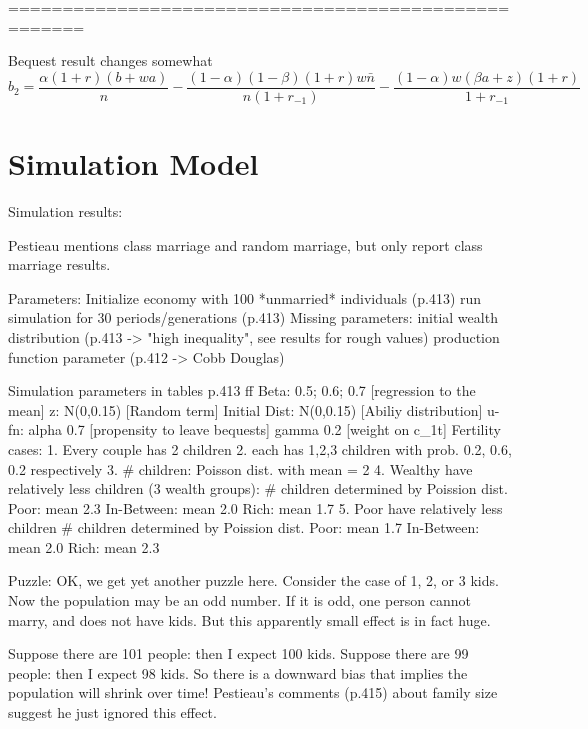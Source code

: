\documentclass{article}
\begin{document}
=====================================================

Bequest result changes somewhat
\begin{equation}
b_{2} =
\frac{\alpha(1+r)(b+wa)}{n}
- \frac{(1-\alpha)(1-\beta)(1+r)w\bar{n}}{n(1+r_{-1})}
- \frac{(1-\alpha)w(\beta a + z)(1+r)}{1+r_{-1}}
\label{Pestieau11p} \tag{Pestieau 11'}
\end{equation}


\section{Simulation Model}

Simulation results:

Pestieau mentions class marriage and random marriage,
but only report class marriage results.

\begin{verbatimtab}
Parameters:
	Initialize economy with 100 *unmarried* individuals (p.413)
	run simulation for 30 periods/generations (p.413)
Missing parameters:
        initial wealth distribution (p.413 -> "high inequality", see results for rough values)
        production function parameter (p.412 -> Cobb Douglas)

Simulation parameters in tables p.413 ff
	Beta:			0.5; 0.6; 0.7	[regression to the mean]
	z: 				N(0,0.15)		[Random term]
	Initial Dist:	N(0,0.15)		[Abiliy distribution]
	u-fn:	alpha	0.7				[propensity to leave bequests]
			gamma	0.2				[weight on c_1t]
	Fertility cases:
		1. Every couple has 2 children
		2. each has 1,2,3 children with prob. 0.2, 0.6, 0.2 respectively
		3. # children: Poisson dist. with mean = 2
		4. Wealthy have relatively less children (3 wealth groups):
			# children determined by Poission dist.
			Poor: 		mean 2.3
			In-Between: mean 2.0
			Rich:		mean 1.7
		5. Poor have relatively less children
			# children determined by Poission dist.
			Poor:		mean 1.7
			In-Between:	mean 2.0
			Rich:		mean 2.3
\end{verbatimtab}

Puzzle:
OK, we get yet another puzzle here.
Consider the case of 1, 2, or 3 kids.
Now the population may be an odd number.
If it is odd, one person cannot marry,
and does not have kids.  But this apparently
small effect is in fact huge.

Suppose there are 101 people:
then I expect 100 kids.
Suppose there are 99 people:
then I expect 98 kids.
So there is a downward bias that implies the population will shrink over time!
Pestieau's comments (p.415) about family size suggest he just ignored this effect.
\end{document}

